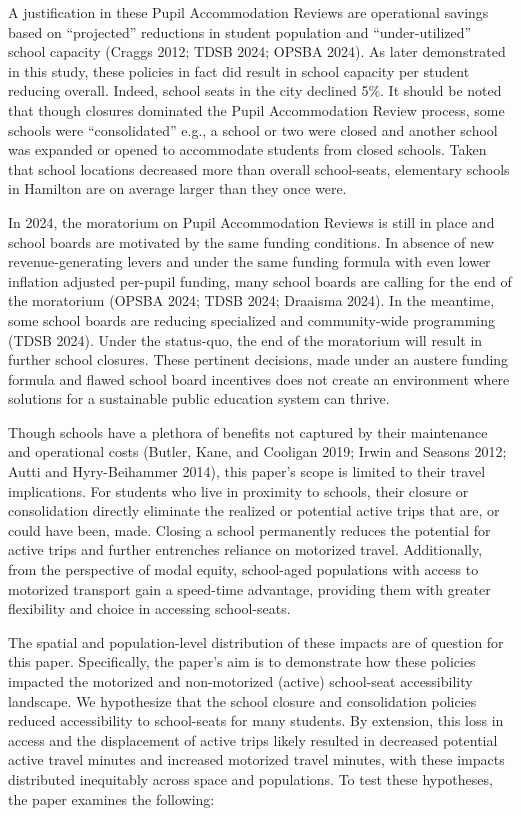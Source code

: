 \documentclass[
default
]{sn-jnl}
\begin{document}
A justification in these Pupil Accommodation Reviews are operational
savings based on ``projected'' reductions in student population and
``under-utilized'' school capacity (Craggs 2012; TDSB 2024; OPSBA 2024).
As later demonstrated in this study, these policies in fact did result
in school capacity per student reducing overall. Indeed, school seats in
the city declined 5\%. It should be noted that though closures dominated
the Pupil Accommodation Review process, some schools were
``consolidated'' e.g., a school or two were closed and another school
was expanded or opened to accommodate students from closed schools.
Taken that school locations decreased more than overall school-seats,
elementary schools in Hamilton are on average larger than they once
were.

In 2024, the moratorium on Pupil Accommodation Reviews is still in place
and school boards are motivated by the same funding conditions. In
absence of new revenue-generating levers and under the same funding
formula with even lower inflation adjusted per-pupil funding, many
school boards are calling for the end of the moratorium (OPSBA 2024;
TDSB 2024; Draaisma 2024). In the meantime, some school boards are
reducing specialized and community-wide programming (TDSB 2024). Under
the status-quo, the end of the moratorium will result in further school
closures. These pertinent decisions, made under an austere funding
formula and flawed school board incentives does not create an
environment where solutions for a sustainable public education system
can thrive.

Though schools have a plethora of benefits not captured by their
maintenance and operational costs (Butler, Kane, and Cooligan 2019;
Irwin and Seasons 2012; Autti and Hyry-Beihammer 2014), this paper's
scope is limited to their travel implications. For students who live in
proximity to schools, their closure or consolidation directly eliminate
the realized or potential active trips that are, or could have been,
made. Closing a school permanently reduces the potential for active
trips and further entrenches reliance on motorized travel. Additionally,
from the perspective of modal equity, school-aged populations with
access to motorized transport gain a speed-time advantage, providing
them with greater flexibility and choice in accessing school-seats.

The spatial and population-level distribution of these impacts are of
question for this paper. Specifically, the paper's aim is to demonstrate
how these policies impacted the motorized and non-motorized (active)
school-seat accessibility landscape. We hypothesize that the school
closure and consolidation policies reduced accessibility to school-seats
for many students. By extension, this loss in access and the
displacement of active trips likely resulted in decreased potential
active travel minutes and increased motorized travel minutes, with these
impacts distributed inequitably across space and populations. To test
these hypotheses, the paper examines the following:
\end{document}
